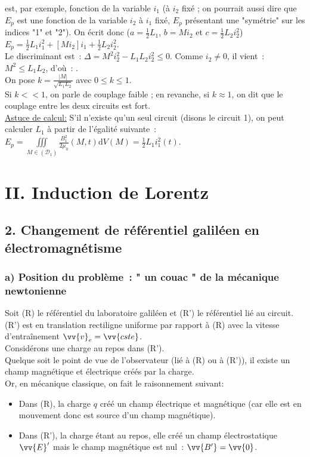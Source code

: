 \documentclass{article}
\let\oldiiint\iiint
\renewcommand{\iiint}{\oldiiint\limits}
\renewcommand\overrightarrow{\vv}
\begin{document}
est, par exemple, fonction de la variable $i_{1}$ (à $i_{2}$ fixé ;
on pourrait aussi dire que $E_{p}$ est une fonction de la variable
$i_{2}$ à $i_{1}$ fixé, $E_{p}$ présentant une "symétrie" sur les
indices "1" et "2"). On écrit donc ($a = \frac{1}{2}L_{1}$,
$b=Mi_{2}$ et $c=\frac{1}{2}L_{2}i_{2}^{2}$) $E_{p} =
\frac{1}{2}L_{1}i_{1}^{2}+\left[Mi_{2}\right]i_{1}+ \frac{1}{2}L_{2}i_{2}^{2}$.
\\
Le discriminant est : $\Delta = M^{2}i_{2}^{2}-L_{1}L_{2}i_{2}^{2}
\leq 0$. Comme $i_{2} \neq 0$, il vient : $M^{2} \leq L_{1}L_{2}$,
d'où : . \\
On pose $k = \frac{|M|}{\sqrt{L_{1}L_{2}}}$ avec $0 \leq k \leq 1$.
\\
Si $k<< 1$, on parle de couplage faible ; en revanche, si $k \approx
1$, on dit que le couplage entre les deux circuits est fort. \\
\underline{Astuce de calcul:} S'il n'existe qu'un seul circuit
(disons le circuit 1), on peut calculer $L_{1}$ à partir de
l'égalité suivante : $E_{p} = \iiint_{M\in
(\mathcal{D}_{1})}\frac{B_{1}^{2}}{2\mu_{0}}(M,t)\mathrm{d}V(M)=\frac{1}{2}L_{1}i_{1}^{2}(t)$.

\section*{II. Induction de Lorentz}
\subsection*{2. Changement de référentiel galiléen en électromagnétisme}
\subsubsection*{a) Position du problème : " un couac " de la mécanique
newtonienne}
Soit (R) le référentiel du laboratoire galiléen et (R') le
référentiel lié au circuit. (R') est en translation rectiligne
uniforme par rapport à
(R) avec la vitesse d'entraînement $\overrightarrow{v}_{e}=\overrightarrow{cste}$. \\
Considérons une charge au repos dans (R').\\
Quelque soit le point de vue de l'observateur (lié à (R) ou à (R')),
il existe un champ magnétique et électrique créés par la charge. \\
Or, en mécanique classique, on fait le raisonnement suivant:
\begin{itemize}
\item Dans (R), la charge $q$ créé un champ électrique et magnétique
(car elle est en mouvement donc est source d'un champ magnétique).
\item Dans (R'), la charge étant au repos, elle créé un champ
électrostatique $\overrightarrow{E}'$ mais le champ magnétique est
nul : $\overrightarrow{B'}  = \overrightarrow{0}$.
\end{itemize}
\end{document}
